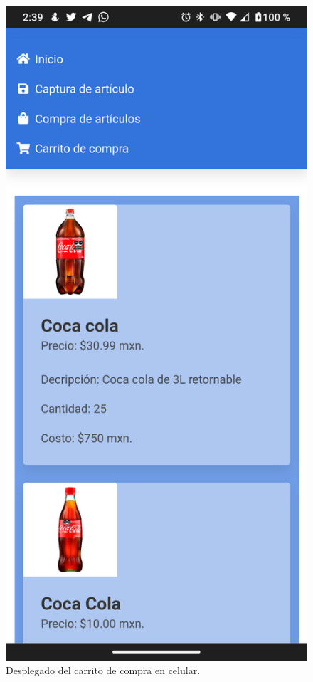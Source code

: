 \documentclass[11pt]{article}
\begin{document}
		\begin{figure}[H]
			\centering
			\includegraphics[scale=0.27]{resources/Screenshot_20211113-023957.png}
			\caption{Desplegado del carrito de compra en celular.}\label{fig:picture}
		\end{figure}
\end{document}
